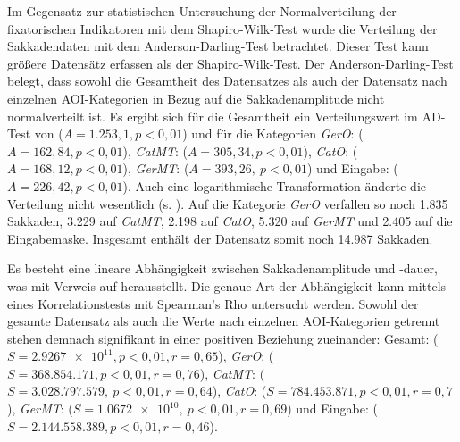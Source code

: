 Im Gegensatz zur statistischen Untersuchung der Normalverteilung der fixatorischen Indikatoren mit dem Shapiro-Wilk-Test wurde die Verteilung der Sakkadendaten mit dem Anderson-Darling-Test betrachtet. Dieser Test kann größere Datensätz erfassen als der Shapiro-Wilk-Test. 
Der Anderson-Darling-Test belegt, dass sowohl die Gesamtheit des Datensatzes als auch der Datensatz nach einzelnen AOI-Kategorien in Bezug auf die Sakkadenamplitude nicht normalverteilt ist. Es ergibt sich für die Gesamtheit ein Verteilungswert im AD-Test von ($A = 1.253,1, p < 0,01$) und für die Kategorien \emph{GerO}: ($A = 162,84, p < 0,01$), \emph{CatMT}: ($A = 305,34, p < 0,01$), \emph{CatO}: ($A = 168,12, p < 0,01$), \emph{GerMT}: ($A = 393,26,\allowbreak\ p < 0,01$) und Eingabe: ($A = 226,42, p < 0,01$). Auch eine logarithmische Transformation änderte die Verteilung nicht wesentlich (s. ). Auf die Kategorie \emph{GerO} verfallen so noch 1.835 Sakkaden, 3.229 auf \emph{CatMT}, 2.198 auf \emph{CatO}, 5.320 auf \emph{GerMT} und 2.405 auf die Eingabemaske. Insgesamt enthält der Datensatz somit noch 14.987 Sakkaden.

Es besteht eine lineare Abhängigkeit zwischen Sakkadenamplitude und -dauer, was \citet[321]{holmqvist_eye_2011} mit Verweis auf \citet[]{carpenter_movements_1988} herausstellt. Die genaue Art der Abhängigkeit kann mittels eines Korrelationstests mit Spearman's Rho untersucht werden. Sowohl der gesamte Datensatz als auch die Werte nach einzelnen AOI-Kategorien getrennt stehen demnach signifikant in einer positiven Beziehung zueinander: Gesamt: ($S = \num{2.9267e11}, p < 0,01, r = 0,65$), \emph{GerO}: ($S = 368.854.171, p < 0,01, r = 0,76$), \emph{CatMT}: ($S = 3.028.797.579,\allowbreak\ p < 0,01,\allowbreak r = 0,64$), \emph{CatO}: ($S = 784.453.871, p < 0,01, r = 0,7$), \emph{GerMT}: ($S = \num{1.0672e10},\allowbreak\ p < 0,01, r = 0,69$) und Eingabe: ($S = 2.144.558.389, p < 0,01, r = 0,46$).\largerpage[2]



